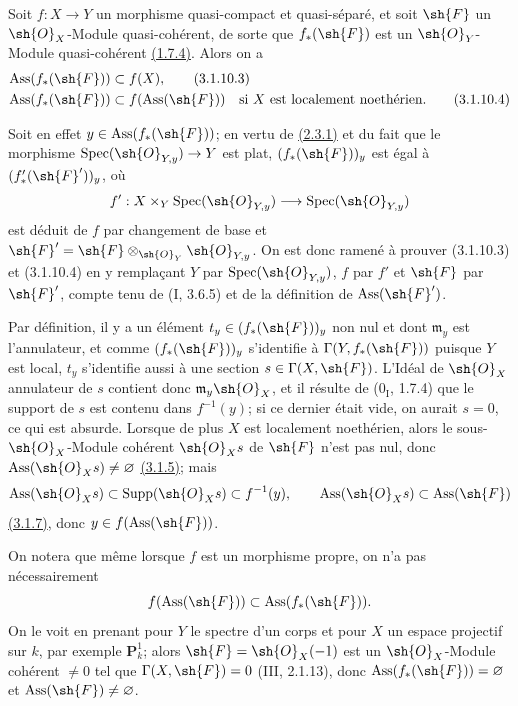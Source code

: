 \begin{remark}[3.1.10.2]
\label{IV.3.1.10.2}
Soit $f:X\to Y$ un morphisme quasi-compact et quasi-séparé, et soit
$\sh{F}$ un $\sh{O}_X$-Module quasi-cohérent, de sorte que
$f_*(\sh{F})$ est un $\sh{O}_Y$-Module quasi-cohérent
{\hyperlink{ega4.c04.statement.1-7-4}{(1.7.4)}}. Alors on a
\begin{align}
 \operatorname{Ass}(f_*(\sh{F}))&\subset f(X),
 \label{IV.3.1.10.3}\tag{3.1.10.3}\\
 \operatorname{Ass}(f_*(\sh{F}))&\subset f(\operatorname{Ass}(\sh{F}))
 \quad\text{si $X$ est localement noethérien}.
 \label{IV.3.1.10.4}\tag{3.1.10.4}
\end{align}

Soit en effet $y\in\operatorname{Ass}(f_*(\sh{F}))$; en vertu de
{\hyperlink{ega4.c04.lem.2-3-1}{(2.3.1)}} et du fait que le morphisme
$\operatorname{Spec}(\sh{O}_{Y,y})\to Y$ est plat,
$(f_*(\sh{F}))_y$ est égal à $(f'_*(\sh{F}'))_y$, où
\[
 f':X\times_Y\operatorname{Spec}(\sh{O}_{Y,y})
 \longrightarrow\operatorname{Spec}(\sh{O}_{Y,y})
\]
est déduit de $f$ par changement de base et
$\sh{F}'=\sh{F}\otimes_{\sh{O}_Y}\sh{O}_{Y,y}$. On est donc ramené à
prouver (3.1.10.3) et (3.1.10.4) en y remplaçant $Y$ par
$\operatorname{Spec}(\sh{O}_{Y,y})$, $f$ par $f'$ et $\sh{F}$ par
$\sh{F}'$, compte tenu de (I, 3.6.5) et de la définition de
$\operatorname{Ass}(\sh{F}')$.

Par définition, il y a un élément
$t_y\in(f_*(\sh{F}))_y$ non nul et dont $\mathfrak m_y$ est
l'annulateur, et comme $(f_*(\sh{F}))_y$ s'identifie à
$\Gamma(Y,f_*(\sh{F}))$ puisque $Y$ est local, $t_y$ s'identifie aussi
à une section $s\in\Gamma(X,\sh{F})$. L'Idéal de $\sh{O}_X$ annulateur
de $s$ contient donc $\mathfrak m_y\sh{O}_X$, et il résulte de
($0_{\mathrm I}$, 1.7.4) que le support de $s$ est contenu dans
$f^{-1}(y)$; si ce dernier était vide, on aurait $s=0$, ce qui est
absurde. Lorsque de plus $X$ est localement noethérien, alors le
sous-$\sh{O}_X$-Module cohérent $\sh{O}_Xs$ de $\sh{F}$ n'est pas nul,
donc $\operatorname{Ass}(\sh{O}_Xs)\neq\varnothing$
{\hyperlink{ega4.c04.cor.3-1-5}{(3.1.5)}}; mais
\[
 \operatorname{Ass}(\sh{O}_Xs)\subset
 \operatorname{Supp}(\sh{O}_Xs)\subset f^{-1}(y),\qquad
 \operatorname{Ass}(\sh{O}_Xs)\subset\operatorname{Ass}(\sh{F})
\]
{\hyperlink{ega4.c04.prop.3-1-7}{(3.1.7)}}, donc
$y\in f(\operatorname{Ass}(\sh{F}))$.
\end{remark}

\begin{remark}[3.1.10.5]
\label{IV.3.1.10.5}
On notera que même lorsque $f$ est un morphisme propre, on n'a pas
nécessairement
\[
 f(\operatorname{Ass}(\sh{F}))\subset
 \operatorname{Ass}(f_*(\sh{F})).
\]
On le voit en prenant pour $Y$ le spectre d'un corps et pour $X$ un
espace projectif sur $k$, par exemple $\mathbf P^1_k$; alors
$\sh{F}=\sh{O}_X(-1)$ est un $\sh{O}_X$-Module cohérent $\neq0$ tel
que $\Gamma(X,\sh{F})=0$ (III, 2.1.13), donc
$\operatorname{Ass}(f_*(\sh{F}))=\varnothing$ et
$\operatorname{Ass}(\sh{F})\neq\varnothing$.
\end{remark}

